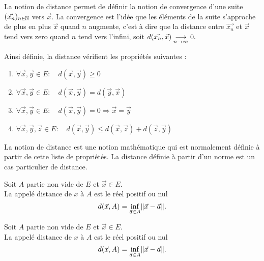 \documentclass{book}
\begin{document}
\begin{Remarque}[Distance]
La notion de distance permet de définir la notion de convergence d'une suite $(\vec{x_n})_{n\in\mathbb{N}}$ vers $\vec{x}$. La convergence est l'idée que les éléments de la suite s'approche de plus en plus $\vec{x}$ quand $n$ augmente, c'est à dire que la distance entre $\vec{x_n}$ et $\vec{x}$ tend vers zero quand $n$ tend vers l'infini, soit $d(\vec{x_n},\vec{x})\tend[n\to\infty]0.$ 
\end{Remarque}
\begin{Proposition}
Ainsi définie, la distance vérifient les propriétés suivantes :
\begin{enumerate}
\item {} $\forall \vec{x},\vec{y}\in E:\quad  d(\vec{x},\vec{y}) \geq  0$
\item {} $\forall \vec{x},\vec{y}\in E:\quad d(\vec{x},\vec{y}) = d(\vec{y},\vec{x})$
\item {} $\forall \vec{x},\vec{y}\in E:\quad  d(\vec{x},\vec{y}) = 0 \Rightarrow \vec{x} = \vec{y}$
\item {} $\forall \vec{x},\vec{y},\vec{z}\in E:\quad  d(\vec{x},\vec{y}) \leq d(\vec{x},\vec{z}) + d(\vec{z},\vec{y})$
\end{enumerate}
\end{Proposition}
\begin{Remarque}
La notion de distance est une notion mathématique qui est normalement définie à partir de cette liste de propriétés. La distance définie à partir d'un norme est un cas particulier de distance. 
\end{Remarque}
\begin{Definition}
Soit $A$ partie non vide de $E$ et $\vec{x}\in E$.\\
La  appelé distance de $x$ à $A$ est le réel positif ou nul
$$d (\vec{x}, A) = \inf_{\vec{a} \in A}  \mathopen\lVert \vec{x} - \vec{a} \mathclose\rVert.$$
\end{Definition}
\begin{Definition}
Soit $A$ partie non vide de $E$ et $\vec{x}\in E$.\\
La  appelé distance de $x$ à $A$ est le réel positif ou nul
$$d (\vec{x}, A) = \inf_{\vec{a} \in A}  \mathopen\lVert \vec{x} - \vec{a} \mathclose\rVert.$$
\end{Definition}
\end{document}
